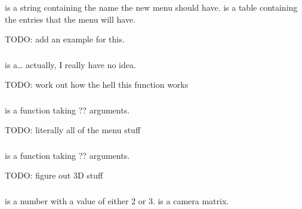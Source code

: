 \documentclass[letterpaper,10pt,english]{sphinxmanual}
\begin{document}
\subsubsection{}
\label{\detokenize{mods:emu-addmenu-menuname-menuentries}}\label{\detokenize{mods:addmenu}}
\sphinxAtStartPar
{} is a string containing the name the new menu should have.  is a table containing the entries that the menu will have.

\sphinxAtStartPar
TODO: add an example for this.


\subsubsection{}
\label{\detokenize{mods:emu-setmenuiteminfo-menuitem-infotable}}\label{\detokenize{mods:setmenuiteminfo}}
\sphinxAtStartPar
{} is a… actually, I really have no idea.

\sphinxAtStartPar
TODO: work out how the hell this function works


\subsubsection{}
\label{\detokenize{mods:emu-registermenustart-func}}\label{\detokenize{mods:registermenustart}}
\sphinxAtStartPar
{} is a function taking ?? arguments.

\sphinxAtStartPar
TODO: literally all of the menu stuff


\subsubsection{}
\label{\detokenize{mods:emu-register3devent-func}}\label{\detokenize{mods:register3devent}}
\sphinxAtStartPar
{} is a function taking ?? arguments.

\sphinxAtStartPar
TODO: figure out 3D stuff


\subsubsection{}
\label{\detokenize{mods:emu-set3dtransform-mode-matrix}}\label{\detokenize{mods:set3dtransform}}
\sphinxAtStartPar
{} is a number with a value of either 2 or 3.  is a camera matrix.
\end{document}
